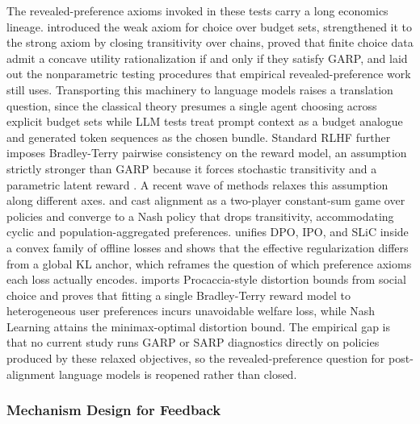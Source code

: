 The revealed-preference axioms invoked in these tests carry a long economics lineage. \citet{samuelson1938consumption} introduced the weak axiom for choice over budget sets, \citet{houthakker1950revealed} strengthened it to the strong axiom by closing transitivity over chains, \citet{afriat1967construction} proved that finite choice data admit a concave utility rationalization if and only if they satisfy GARP, and \citet{varian1982nonparametric} laid out the nonparametric testing procedures that empirical revealed-preference work still uses. Transporting this machinery to language models raises a translation question, since the classical theory presumes a single agent choosing across explicit budget sets while LLM tests treat prompt context as a budget analogue and generated token sequences as the chosen bundle. Standard RLHF further imposes Bradley-Terry pairwise consistency on the reward model, an assumption strictly stronger than GARP because it forces stochastic transitivity and a parametric latent reward \citep{raheja2026unification}. A recent wave of methods relaxes this assumption along different axes. \citet{liu2024comal} and \citet{zhang2025omd} cast alignment as a two-player constant-sum game over policies and converge to a Nash policy that drops transitivity, accommodating cyclic and population-aggregated preferences. \citet{tang2024gpo} unifies DPO, IPO, and SLiC inside a convex family of offline losses and shows that the effective regularization differs from a global KL anchor, which reframes the question of which preference axioms each loss actually encodes. \citet{golz2025distortion} imports Procaccia-style distortion bounds from social choice and proves that fitting a single Bradley-Terry reward model to heterogeneous user preferences incurs unavoidable welfare loss, while Nash Learning attains the minimax-optimal distortion bound. The empirical gap is that no current study runs GARP or SARP diagnostics directly on policies produced by these relaxed objectives, so the revealed-preference question for post-alignment language models is reopened rather than closed.

\subsubsection{Mechanism Design for Feedback}

